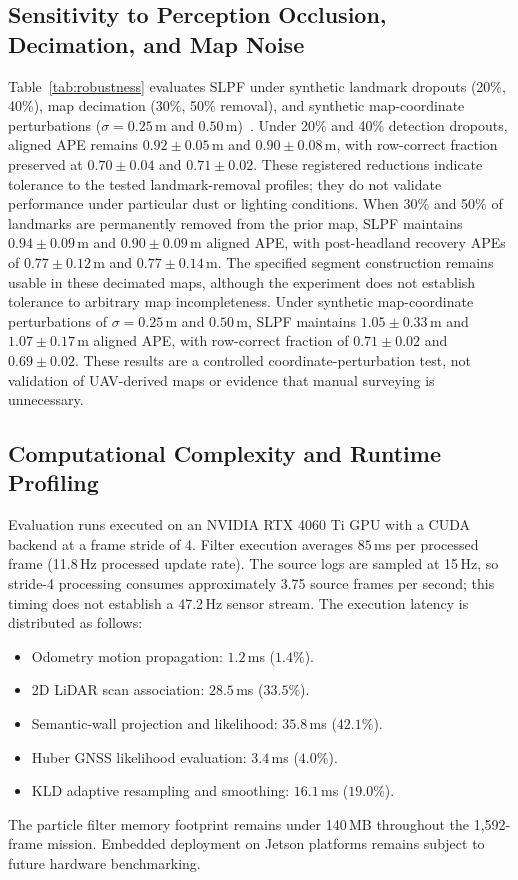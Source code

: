 \documentclass[letterpaper, 10 pt, conference]{ieeeconf}
\begin{document}
\subsection{Sensitivity to Perception Occlusion, Decimation, and Map Noise}
Table~\ref{tab:robustness} evaluates SLPF under synthetic landmark dropouts (20\%, 40\%), map decimation (30\%, 50\% removal), and synthetic map-coordinate perturbations ($\sigma = 0.25\,$m and $0.50\,$m)~\cite{cox2024integrated}.
Under 20\% and 40\% detection dropouts, aligned APE remains $0.92\pm0.05\,$m and $0.90\pm0.08\,$m, with row-correct fraction preserved at $0.70\pm0.04$ and $0.71\pm0.02$. These registered reductions indicate tolerance to the tested landmark-removal profiles; they do not validate performance under particular dust or lighting conditions.
When 30\% and 50\% of landmarks are permanently removed from the prior map, SLPF maintains $0.94\pm0.09\,$m and $0.90\pm0.09\,$m aligned APE, with post-headland recovery APEs of $0.77\pm0.12\,$m and $0.77\pm0.14\,$m. The specified segment construction remains usable in these decimated maps, although the experiment does not establish tolerance to arbitrary map incompleteness.
Under synthetic map-coordinate perturbations of $\sigma = 0.25\,$m and $0.50\,$m, SLPF maintains $1.05\pm0.33\,$m and $1.07\pm0.17\,$m aligned APE, with row-correct fraction of $0.71\pm0.02$ and $0.69\pm0.02$. These results are a controlled coordinate-perturbation test, not validation of UAV-derived maps or evidence that manual surveying is unnecessary.

\subsection{Computational Complexity and Runtime Profiling}
Evaluation runs executed on an NVIDIA RTX 4060 Ti GPU with a CUDA backend at a frame stride of 4. Filter execution averages $85\,$ms per processed frame (11.8\,Hz processed update rate). The source logs are sampled at 15\,Hz, so stride-4 processing consumes approximately 3.75 source frames per second; this timing does not establish a 47.2\,Hz sensor stream. The execution latency is distributed as follows:
\begin{itemize}
  \item Odometry motion propagation: $1.2\,$ms ($1.4\%$).
  \item 2D LiDAR scan association: $28.5\,$ms ($33.5\%$).
  \item Semantic-wall projection and likelihood: $35.8\,$ms ($42.1\%$).
  \item Huber GNSS likelihood evaluation: $3.4\,$ms ($4.0\%$).
  \item KLD adaptive resampling and smoothing: $16.1\,$ms ($19.0\%$).
\end{itemize}
The particle filter memory footprint remains under 140\,MB throughout the 1,592-frame mission. Embedded deployment on Jetson platforms remains subject to future hardware benchmarking.
\end{document}

